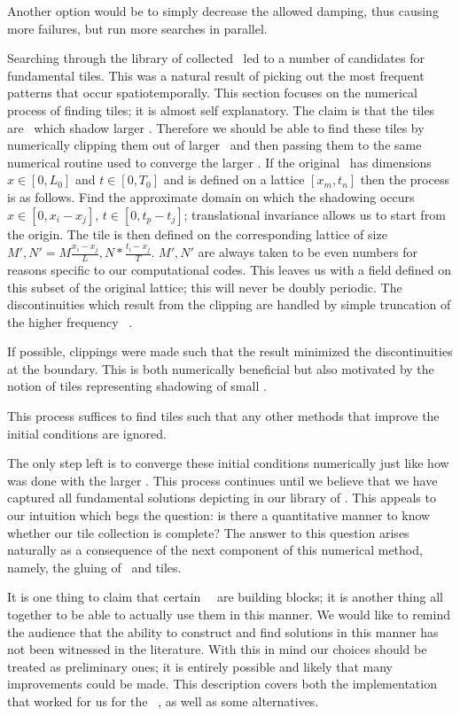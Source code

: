 \begin{description}
{Another option would be to simply decrease the allowed damping, thus causing more failures,
but run more searches in parallel.


Searching through the library of collected \twots\ led to a number of candidates
for fundamental tiles. This was a natural result of picking out the most frequent patterns
that occur spatiotemporally. This section focuses on the numerical process of finding tiles;
it is almost self explanatory. The claim is that the tiles are \twots\ which shadow larger \twots.
Therefore we should be able to find these tiles by numerically clipping them out of larger \twots\
and then passing them to the same numerical routine used to converge the larger \twot. If
the original \twot\ has dimensions $x \in [0, L_0]$ and $t \in [0, T_0]$ and is defined on
a lattice $[x_m, t_n]$ then the process is as follows. Find the approximate domain on which
the shadowing occurs $x \in [0, x_{i}-x_{j}]$, $t \in [0, t_{p}-t_{j}]$; translational invariance allows
us to start from the origin. The tile is then defined on the corresponding lattice of size
$M', N' = M \frac{x_{i}-x_{j}}{L}, N * \frac{t_{i}-x_{j}}{T}$.
$M', N'$ are always taken to be even numbers for reasons specific to our computational codes.
This leaves us with a field defined on this subset of the original lattice;
this will never be doubly periodic. The discontinuities which result from
the clipping are handled by simple truncation of the higher
frequency \spt\ \Fcs.

If possible, clippings were made such that the result minimized the discontinuities at
the boundary. This is both numerically beneficial but also motivated by the notion
of tiles representing shadowing of small \twots.

This process suffices to find tiles such that any other methods that
improve the initial conditions are ignored.

The only step left is to converge these initial conditions numerically
just like how was done with the larger \twots.
This process continues until we believe that we have captured all
fundamental solutions depicting in our library of \twots.
This appeals to our intuition which begs the question: is there a quantitative
manner to know whether our tile collection is complete? The answer to this
question arises naturally as a consequence of the next component of this numerical method,
namely, the gluing of \twots\ and tiles.


It is one thing to claim that certain \spt\ \twots\ are building blocks; it is
another thing all together to be able to actually use them in this manner. We would like to
remind the audience that the ability to construct and find solutions in this manner
has not been witnessed in the literature. With this in mind our choices should
be treated as preliminary ones; it is entirely possible and likely that
many improvements could be made. This
description covers both the implementation that worked for us for the \spt\ \KSe,
as well as some alternatives.

}
\end{description}
